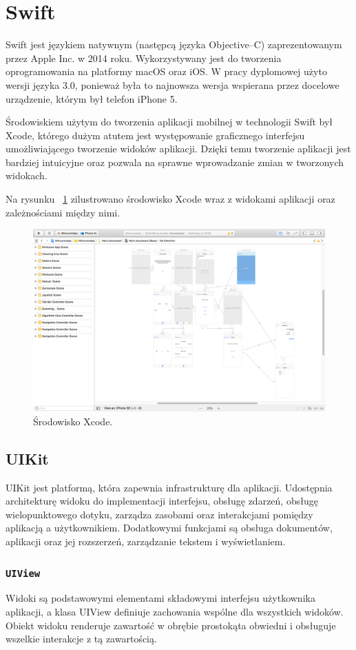 \section{Swift}
Swift jest językiem natywnym (następcą języka Objective–C) zaprezentowanym przez Apple Inc. w 2014 roku. Wykorzystywany jest do tworzenia oprogramowania na platformy macOS oraz iOS. W pracy dyplomowej użyto wersji języka 3.0, ponieważ była to najnowsza wersja wspierana przez docelowe urządzenie, którym był telefon iPhone 5.

Środowiskiem użytym do tworzenia aplikacji mobilnej w technologii Swift był Xcode, którego dużym atutem jest występowanie graficznego interfejsu umożliwiającego tworzenie widoków aplikacji. Dzięki temu tworzenie aplikacji jest bardziej intuicyjne oraz pozwala na sprawne wprowadzanie zmian w tworzonych widokach.

Na rysunku ~\ref{fig:xcode} zilustrowano środowisko Xcode wraz z widokami aplikacji oraz zależnościami między nimi.   

\begin{figure}[H]
	\centering
		\includegraphics[width=0.75\linewidth]{pic02/xcode}
	\caption{Środowisko Xcode.}
	\label{fig:xcode}	
\end{figure}

\subsection{UIKit}
UIKit jest platformą, która zapewnia infrastrukturę dla aplikacji. Udostępnia  architekturę widoku do implementacji interfejsu, obsługę zdarzeń, obsługę wielopunktowego dotyku, zarządza zasobami oraz interakcjami pomiędzy aplikacją a użytkownikiem. Dodatkowymi funkcjami są obsługa dokumentów, aplikacji oraz jej rozszerzeń, zarządzanie tekstem i wyświetlaniem.

 \subsubsection{\lstinline$UIView$}
Widoki są podstawowymi elementami składowymi interfejsu użytkownika aplikacji, a klasa UIView definiuje zachowania wspólne dla wszystkich widoków. Obiekt widoku renderuje zawartość w obrębie prostokąta obwiedni i obsługuje wszelkie interakcje z tą zawartością. 

